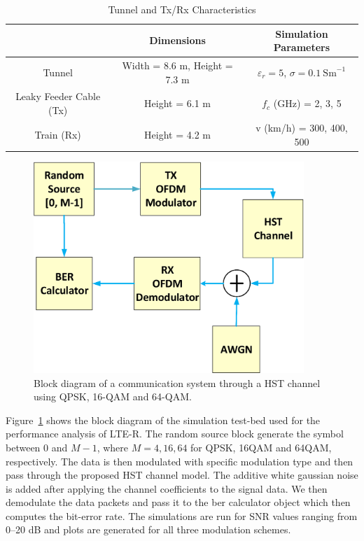 \begin{table}[t!]
\centering
\caption{Tunnel and Tx/Rx Characteristics}
\begin{tabular}{c  c  c }
   & Dimensions & Simulation Parameters\\\hline
Tunnel & Width = 8.6 m, Height = 7.3 m & $\varepsilon_r = 5$, $\sigma = 0.1~\textrm{Sm}^{-1}$\\\hline
Leaky Feeder Cable (Tx) & Height = 6.1 m & $f_c$ (GHz) = 2, 3, 5\\\hline
Train (Rx) & Height = 4.2 m &  v (km/h) = 300, 400, 500\\
\hline
\end{tabular}
\label{tablelter}
\end{table}

\begin{figure}[!ht]
\centering
\includegraphics[width=\textwidth,height=8cm,keepaspectratio]{images/Gill/lte_figs/finalblock.eps} 
\caption{Block diagram of a communication system through a HST channel using QPSK, 16-QAM and 64-QAM.}
\label{finalblock}
\end{figure}

Figure~\ref{finalblock} shows the block diagram of the simulation test-bed used for the performance analysis of LTE-R. The random source block generate the symbol between 0 and $M-1$, where $M = 4,16,64$ for QPSK, 16QAM and 64QAM, respectively. The data is then modulated with specific modulation type and then pass through the proposed HST channel model. The additive white gaussian noise is added after applying the channel coefficients to the signal data. We then demodulate the data packets and pass it to the ber calculator object which then computes the bit-error rate. The simulations are run for SNR values ranging from 0--20 dB and plots are generated for all three modulation schemes.

